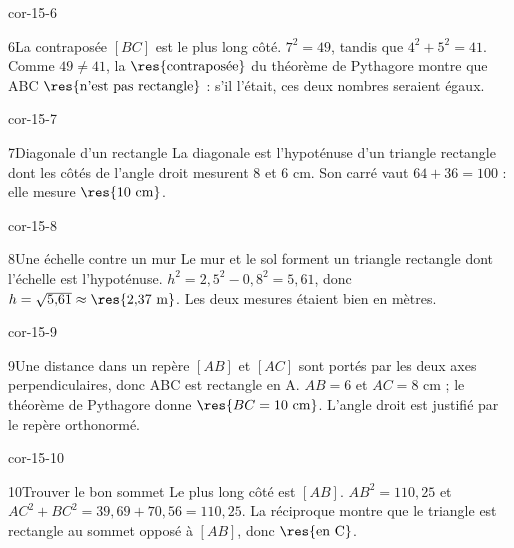 \begin{blocLivre}{cor-15-6}\begin{corrige}{6}{La contraposée}
$[BC]$ est le plus long côté. $7^2=49$, tandis que $4^2+5^2=41$. Comme $49\ne41$, la $\res{\text{contraposée}}$ du théorème de Pythagore montre que ABC $\res{\text{n’est pas rectangle}}$ : s’il l’était, ces deux nombres seraient égaux.
\label{fig-cor-15-6}
\end{corrige}\end{blocLivre}
\begin{blocLivre}{cor-15-7}\begin{corrige}{7}{Diagonale d’un rectangle}
La diagonale est l’hypoténuse d’un triangle rectangle dont les côtés de l’angle droit mesurent 8 et 6 cm. Son carré vaut $64+36=100$ : elle mesure $\res{10\ \mathrm{cm}}$.
\label{fig-cor-15-7}
\end{corrige}\end{blocLivre}
\begin{blocLivre}{cor-15-8}\begin{corrige}{8}{Une échelle contre un mur}
Le mur et le sol forment un triangle rectangle dont l’échelle est l’hypoténuse. $h^2=2{,}5^2-0{,}8^2=5{,}61$, donc $h=\sqrt{5{,}61}\approx\res{2{,}37\ \mathrm m}$. Les deux mesures étaient bien en mètres.
\label{fig-cor-15-8}
\end{corrige}\end{blocLivre}
\begin{blocLivre}{cor-15-9}\begin{corrige}{9}{Une distance dans un repère}
$[AB]$ et $[AC]$ sont portés par les deux axes perpendiculaires, donc ABC est rectangle en A. $AB=6$ et $AC=8$ cm ; le théorème de Pythagore donne $\res{BC=10\ \mathrm{cm}}$. L’angle droit est justifié par le repère orthonormé.
\label{fig-cor-15-9}
\end{corrige}\end{blocLivre}
\begin{blocLivre}{cor-15-10}\begin{corrige}{10}{Trouver le bon sommet}
Le plus long côté est $[AB]$. $AB^2=110{,}25$ et $AC^2+BC^2=39{,}69+70{,}56=110{,}25$. La réciproque montre que le triangle est rectangle au sommet opposé à $[AB]$, donc $\res{\text{en C}}$.
\label{fig-cor-15-10}
\end{corrige}\end{blocLivre}
